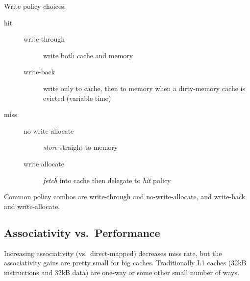 Write policy choices:
\begin{description}
	\item[hit] 
	\begin{description}
		\item[write-through] write both cache and memory
		\item[write-back] write only to cache, then to memory when a dirty-memory cache is evicted (variable time)
	\end{description}
	\item[miss] 
	\begin{description}
		\item[no write allocate] \emph{store} straight to memory
		\item[write allocate] \emph{fetch} into cache then delegate to \emph{hit} policy
	\end{description}
\end{description}
Common policy combos are write-through and no-write-allocate, and write-back and write-allocate.

\subsection{Associativity vs.~Performance}
Increasing associativity (vs.~direct-mapped) decreases miss rate, but the associativity gains are pretty small for big caches. Traditionally L1 caches (32kB instructions and 32kB data) are one-way or some other small number of ways.


